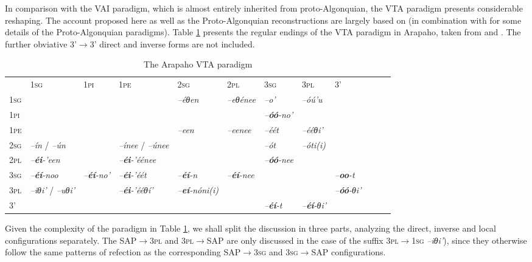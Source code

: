 \documentclass[twoside,a4paper,11pt]{article}
\newcommand{\ipa}[1]{{\phon\textit{#1}}}
\newcommand{\sg}{\textsc{sg}}
\newcommand{\pl}{\textsc{pl}}
\newcommand{\grise}[1]{\cellcolor{lightgray}\textbf{#1}}
\newcommand{\pli}{\textsc{pi}}
\newcommand{\pe}{\textsc{pe}}
\begin{document}
In comparison with the VAI paradigm, which is almost entirely inherited from proto-Algonquian, the VTA paradigm presents considerable reshaping. The account proposed here as well as the Proto-Algonquian reconstructions are largely based on  \citet[19-24]{goddard65arapaho} (in combination with  \citealt{goddard00cheyenne} for some details of the Proto-Algonquian paradigms). Table \ref{tab:arapaho.vta}   presents the regular endings of the VTA paradigm in Arapaho, taken from  \citet[487-490]{cowell06arapaho} and \citet[448]{cowell05hinono}. The  further obviative 3'$\rightarrow$3' direct and inverse forms are not included.

\begin{table}[H]
\caption{The Arapaho VTA paradigm}
\centering \label{tab:arapaho.vta}
\begin{tabular}{llllllllllll}
\toprule
 & 	1\sg{}& 	1\pli{} & 	1\pe{} & 	2\sg{}& 	2\pl{}& 	3\sg{} & 	3\pl{} & 	3' & 	\\
1\sg{}& \grise{} & 	\grise{} & 	\grise{} & 	\ipa{--éθen} & 	\ipa{--eθénee} & 	\ipa{--o'} &\ipa{--óú'u}  	 & 	 & 	\\
1\pli{} & 	\grise{} & 	\grise{} & 	\grise{} & 	\grise{} & 	\grise{} & 	\ipa{--\textbf{óó}-no'} & 	 & 	 & 	\\
1\pe{} & 	\grise{} & 	\grise{} & 	\grise{} & 	\ipa{--een} & 	\ipa{--eenee} & 	\ipa{--éét} & 	\ipa{--ééθi'}  & 	 & 	\\
2\sg{}& 	\ipa{--ín} / \ipa{--ún}& 	\grise{} & \ipa{--ínee} /	\ipa{--únee} & 	\grise{} & 	\grise{} & 	\ipa{--ót} & 	 \ipa{--óti(i)}& 	 & 	\\
2\pl{}& 	\ipa{--\textbf{éi}-'een} & 	\grise{} & 	\ipa{--\textbf{éi}-'éénee} & 	\grise{} & 	\grise{} & 	\ipa{--\textbf{óó}-nee} & 	 & 	 & 	\\
3\sg{} & 	\ipa{--\textbf{éí}-noo} & 	\ipa{--\textbf{éí}-no'} & 	\ipa{--\textbf{éi}-'éét} & 	\ipa{--\textbf{éí}-n} & 	\ipa{--\textbf{éí}-nee} & 	\grise{} & 	\grise{} & 	\ipa{--\textbf{oo}-t} & 	\\
3\pl{}& \ipa{--iθi'} /	\ipa{--uθi'} & 	 & 	\ipa{--\textbf{éi}-'ééθí'}  & 	\ipa{--\textbf{eí}-nóni(i)}  & 	 & 	\grise{} & 	\grise{} & 	\ipa{--\textbf{óó}-θi'} & 	\\
3' & 	 & 	 & 	 & 	 & 	 & 	\ipa{--\textbf{éí}-t} & 	\ipa{--\textbf{éí}-θi'} &   & 	\\
\bottomrule
\end{tabular}
\end{table}

Given the complexity of the paradigm in Table \ref{tab:arapaho.vta}, we shall split the discussion  in three parts, analyzing the direct, inverse and local configurations separately. The SAP$\rightarrow$3\pl{} and 3\pl{}$\rightarrow$SAP are only discussed in the case of the suffix 3\pl{}$\rightarrow$1\sg{} \ipa{--iθi'}), since they otherwise follow the same patterns of refection as the  corresponding SAP$\rightarrow$3\sg{} and 3\sg{}$\rightarrow$SAP configurations.
\end{document}

